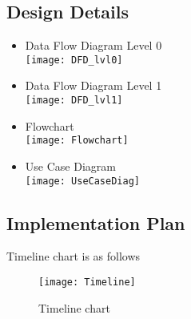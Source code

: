 		\subsection{Design Details}
		  \begin{itemize}
		  
		  \item Data Flow Diagram Level 0\\
		  
		  
		  \texttt{[image: DFD\_lvl0]}
		  
		  \label{fig:DFD_Level0}
		  
		  
		  
			\item Data Flow Diagram Level 1\\  
		  
		   \texttt{[image: DFD\_lvl1]}
		   
		  \label{fig:DFD_Level1}
		  
		  
			\item Flowchart\\
		  
		   \texttt{[image: Flowchart]}
		   
		  \label{fig:Flowchart}
		  
		  \item Use Case Diagram\\
		  
		  
		   \texttt{[image: UseCaseDiag]}
		   
		  \label{fig:Use_Case_Diagram}
				
				
		
		  \end{itemize}		
		
		
		
		
				
		\subsection{Implementation Plan}
		
		  
		  
		  
		  
		  Timeline chart is as follows
	
		   \begin{figure}
		   	  \centering
		   \hfill\texttt{[image: Timeline]}\hspace{\fill}
		   \caption{Timeline chart}
		   \end{figure}
				
				
		
		  	
		
		
		
		
		
		
		
		
		
